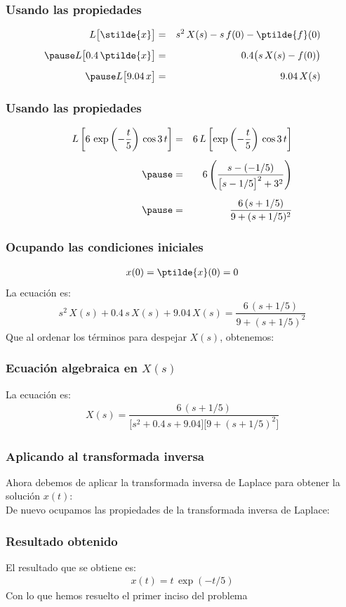 \begin{frame}
\frametitle{Usando las propiedades}
\begin{eqnarray*}
L \big[\stilde{x}\big] &=& s^{2} \, X(s) - s \, f(0) - \ptilde{f}(0) \\[0.5em] \pause
L \big[0.4 \, \ptilde{x}\big] &=& 0. 4 \big( s \, X(s) - f(0)\big) \\[0.5em] \pause
L \big[9.04 \, x\big] &=& 9.04 \, X(s)
\end{eqnarray*}
\end{frame}
\begin{frame}
\frametitle{Usando las propiedades}
\begin{eqnarray*}
L \left[ 6 \, \exp \left( -\dfrac{t}{5}\right) \, \cos 3 \, t \right] &=& 6 \, L \left[\exp \left( -\dfrac{t}{5}\right) \, \cos 3 \, t \right] \\[0.5em] \pause
&=& 6 \left( \dfrac{s - (-1/5)}{\big[s - 1/5\big]^{2} + 3^{2}} \right) \\[0.5em] \pause
&=& \dfrac{6 \, (s + 1/5)}{9 + (s + 1/5)^{2}}
\end{eqnarray*}
\end{frame}
\begin{frame}
\frametitle{Ocupando las condiciones iniciales}
\begin{align*}
x(0) = \ptilde{x}(0) = 0
\end{align*}
\pause
La ecuación es:
\begin{align*}
s^{2} \, X(s) + 0.4 \, s \, X(s) + 9.04 \, X(s) = \dfrac{6 \, (s + 1/5)}{9 + (s + 1/5)^{2}}
\end{align*}
\pause
Que al ordenar los términos para despejar $X(s)$, obtenemos:
\end{frame}
\begin{frame}
\frametitle{Ecuación algebraica en $X(s)$}
La ecuación es:
\begin{align*}
X(s) = \dfrac{6 \, (s + 1/5)}{\big[s^{2} + 0.4 \, s + 9.04\big] \big[9 + (s + 1/5)^{2}\big]}
\end{align*}
\end{frame}
\begin{frame}
\frametitle{Aplicando al transformada inversa}
Ahora debemos de aplicar la transformada inversa de Laplace para obtener la solución $x(t)$:
\\
\bigskip
\pause
De nuevo ocupamos las propiedades de la transformada inversa de Laplace:
\end{frame}
\begin{frame}
\frametitle{Resultado obtenido}
El resultado que se obtiene es:
\pause
\begin{align*}
x(t) = t \, \exp (-t/5)
\end{align*}
Con lo que hemos resuelto el primer inciso del problema
\end{frame}
